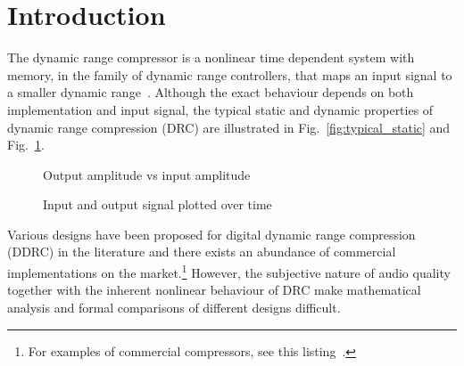 \documentclass[../main2.tex]{subfiles}
\providecommand{\rootdir}{..}
\begin{document}
\section{Introduction}
The dynamic range compressor is a nonlinear time dependent system with memory, in the family of dynamic range controllers, that maps an input signal to a smaller dynamic range~\cite{dafx11}. Although the exact behaviour depends on both implementation and input signal, the typical static and dynamic properties of dynamic range compression (DRC) are illustrated in Fig.~\ref{fig:typical_static} and Fig.~\ref{fig:typical_envelope}.

\begin{figure}[ht]
\captionsetup{justification=centering}

\begin{minipage}[t]{.5\textwidth}
 \centering

\caption{Output amplitude vs input amplitude} 
\label{fig:typical_static}
\end{minipage}%
\begin{minipage}[t]{.5\textwidth}
\centering

\caption{Input and output signal plotted over time} 
\label{fig:typical_envelope}
\end{minipage}
\end{figure}

Various designs have been proposed for digital dynamic range compression (DDRC) in the literature and there exists an abundance of commercial implementations on the market.\footnote{For examples of commercial compressors, see this listing~\cite{commercial}.} However, the subjective nature of audio quality together with the inherent nonlinear behaviour of DRC make mathematical analysis and formal comparisons of different designs difficult. 
\end{document}
